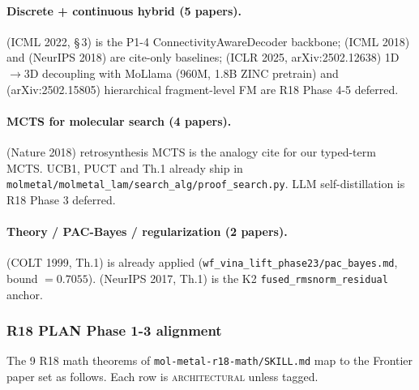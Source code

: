 \paragraph{Discrete + continuous hybrid (5 papers).}
\cite{danihelka2022gumbeltopk} (ICML 2022, \S\,3) is the
P1-4 ConnectivityAwareDecoder backbone; \cite{jin2018jtnvae}
(ICML 2018) and \cite{you2018gcn} (NeurIPS 2018) are cite-only
baselines; \cite{liu2025nextmol} (ICLR 2025, arXiv:2502.12638)
1D$\to$3D decoupling with MoLlama (960M, 1.8B ZINC pretrain) and
\cite{lee2025fragfm} (arXiv:2502.15805) hierarchical fragment-level FM
are R18 Phase 4-5 deferred.

\paragraph{MCTS for molecular search (4 papers).}
\cite{segler2018nature} (Nature 2018) retrosynthesis MCTS is the
analogy cite for our typed-term MCTS.  \cite{auer2002ucb} UCB1,
\cite{rosin2011puct} PUCT and \cite{auger2013mcts} Th.1 already
ship in \texttt{molmetal/molmetal\_lam/search\_alg/proof\_search.py}.
\cite{restmcts2025} LLM self-distillation is R18 Phase 3 deferred.

\paragraph{Theory / PAC-Bayes / regularization (2 papers).}
\cite{mcallester1999pacbayes} (COLT 1999, Th.1) is already applied
(\texttt{wf\_vina\_lift\_phase23/pac\_bayes.md}, bound $= 0.7055$).
\cite{neyshabur2017spectralnorm} (NeurIPS 2017, Th.1) is the
K2 \texttt{fused\_rmsnorm\_residual} anchor.

\subsubsection{R18 PLAN Phase 1-3 alignment}
\label{sec:method:frontier-survey-r18}

The 9 R18 math theorems of \texttt{mol-metal-r18-math/SKILL.md} map
to the Frontier paper set as follows.  Each row is \textsc{architectural}
unless tagged.

